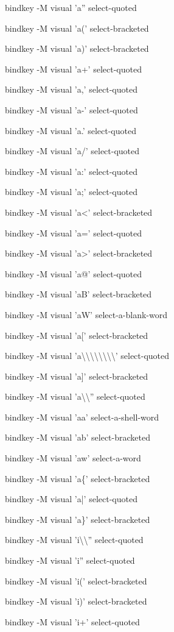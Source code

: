 \documentclass[11pt,a4paper,twoside]{book}
\begin{document}
bindkey -M visual 'a'' select-quoted

bindkey -M visual 'a(' select-bracketed

bindkey -M visual 'a)' select-bracketed

bindkey -M visual 'a+' select-quoted

bindkey -M visual 'a,' select-quoted

bindkey -M visual 'a-' select-quoted

bindkey -M visual 'a.' select-quoted

bindkey -M visual 'a/' select-quoted

bindkey -M visual 'a:' select-quoted

bindkey -M visual 'a;' select-quoted

bindkey -M visual 'a<' select-bracketed

bindkey -M visual 'a=' select-quoted

bindkey -M visual 'a>' select-bracketed

bindkey -M visual 'a@' select-quoted

bindkey -M visual 'aB' select-bracketed

bindkey -M visual 'aW' select-a-blank-word

bindkey -M visual 'a[' select-bracketed

bindkey -M visual 'a\textbackslash{}\textbackslash{}\textbackslash{}\textbackslash{}\textbackslash{}\textbackslash{}\textbackslash{}\textbackslash{}' select-quoted

bindkey -M visual 'a]' select-bracketed

bindkey -M visual 'a\textbackslash{}\textbackslash{}'' select-quoted

bindkey -M visual 'aa' select-a-shell-word

bindkey -M visual 'ab' select-bracketed

bindkey -M visual 'aw' select-a-word

bindkey -M visual 'a\{' select-bracketed

bindkey -M visual 'a|' select-quoted

bindkey -M visual 'a\}' select-bracketed

bindkey -M visual 'i\textbackslash{}\textbackslash{}'' select-quoted

bindkey -M visual 'i'' select-quoted

bindkey -M visual 'i(' select-bracketed

bindkey -M visual 'i)' select-bracketed

bindkey -M visual 'i+' select-quoted
\end{document}
